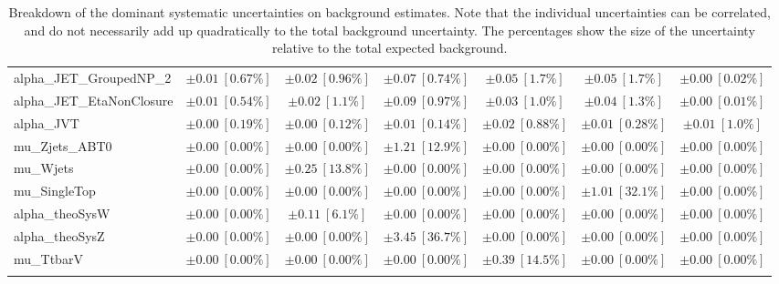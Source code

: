 \begin{sidewaystable}
\begin{center}
\begin{tabular*}{\textwidth}{@{\extracolsep{\fill}}lcccccc}
alpha\_JET\_GroupedNP\_2         & $\pm 0.01\ [0.67\%] $          & $\pm 0.02\ [0.96\%] $          & $\pm 0.07\ [0.74\%] $          & $\pm 0.05\ [1.7\%] $          & $\pm 0.05\ [1.7\%] $          & $\pm 0.00\ [0.02\%] $       \\
alpha\_JET\_EtaNonClosure         & $\pm 0.01\ [0.54\%] $          & $\pm 0.02\ [1.1\%] $          & $\pm 0.09\ [0.97\%] $          & $\pm 0.03\ [1.0\%] $          & $\pm 0.04\ [1.3\%] $          & $\pm 0.00\ [0.01\%] $       \\
alpha\_JVT         & $\pm 0.00\ [0.19\%] $          & $\pm 0.00\ [0.12\%] $          & $\pm 0.01\ [0.14\%] $          & $\pm 0.02\ [0.88\%] $          & $\pm 0.01\ [0.28\%] $          & $\pm 0.01\ [1.0\%] $       \\
mu\_Zjets\_ABT0         & $\pm 0.00\ [0.00\%] $          & $\pm 0.00\ [0.00\%] $          & $\pm 1.21\ [12.9\%] $          & $\pm 0.00\ [0.00\%] $          & $\pm 0.00\ [0.00\%] $          & $\pm 0.00\ [0.00\%] $       \\
mu\_Wjets         & $\pm 0.00\ [0.00\%] $          & $\pm 0.25\ [13.8\%] $          & $\pm 0.00\ [0.00\%] $          & $\pm 0.00\ [0.00\%] $          & $\pm 0.00\ [0.00\%] $          & $\pm 0.00\ [0.00\%] $       \\
mu\_SingleTop         & $\pm 0.00\ [0.00\%] $          & $\pm 0.00\ [0.00\%] $          & $\pm 0.00\ [0.00\%] $          & $\pm 0.00\ [0.00\%] $          & $\pm 1.01\ [32.1\%] $          & $\pm 0.00\ [0.00\%] $       \\
alpha\_theoSysW         & $\pm 0.00\ [0.00\%] $          & $\pm 0.11\ [6.1\%] $          & $\pm 0.00\ [0.00\%] $          & $\pm 0.00\ [0.00\%] $          & $\pm 0.00\ [0.00\%] $          & $\pm 0.00\ [0.00\%] $       \\
alpha\_theoSysZ         & $\pm 0.00\ [0.00\%] $          & $\pm 0.00\ [0.00\%] $          & $\pm 3.45\ [36.7\%] $          & $\pm 0.00\ [0.00\%] $          & $\pm 0.00\ [0.00\%] $          & $\pm 0.00\ [0.00\%] $       \\
mu\_TtbarV         & $\pm 0.00\ [0.00\%] $          & $\pm 0.00\ [0.00\%] $          & $\pm 0.00\ [0.00\%] $          & $\pm 0.39\ [14.5\%] $          & $\pm 0.00\ [0.00\%] $          & $\pm 0.00\ [0.00\%] $       \\
\noalign{\smallskip}\hline\noalign{\smallskip}
\end{tabular*}
\end{center}
\caption[Breakdown of uncertainty on background estimates]{
Breakdown of the dominant systematic uncertainties on background estimates.
Note that the individual uncertainties can be correlated, and do not necessarily add up quadratically to 
the total background uncertainty. The percentages show the size of the uncertainty relative to the total expected background.
\label{table.results.bkgestimate.uncertainties.SRA_T0_bybkg}}
\end{sidewaystable}
%

